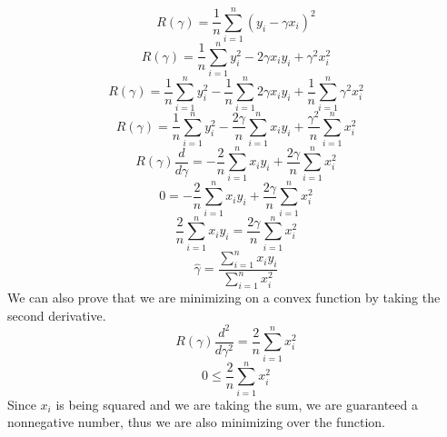 \documentclass[11pt]{article}
\begin{document}

\begin{Answer}
	$$R(\gamma) = \frac{1}{n}\sum^n_{i = 1}(y_i - \gamma x_i)^2$$
	$$R(\gamma) = \frac{1}{n}\sum^n_{i = 1}y_i^2 - 2\gamma x_iy_i + \gamma^2x_i^2$$
	$$R(\gamma) = \frac{1}{n}\sum^n_{i = 1}y_i^2 - \frac{1}{n}\sum^n_{i = 1}2\gamma x_iy_i + \frac{1}{n}\sum^n_{i = 1}\gamma^2x_i^2$$
	$$R(\gamma) = \frac{1}{n}\sum^n_{i = 1}y_i^2 - \frac{2\gamma}{n}\sum^n_{i = 1}x_iy_i + \frac{\gamma^2}{n}\sum^n_{i = 1}x_i^2$$
	$$R(\gamma)\frac{d}{d\gamma} = - \frac{2}{n}\sum^n_{i = 1}x_iy_i + \frac{2\gamma}{n}\sum^n_{i = 1}x_i^2$$
	$$0 = - \frac{2}{n}\sum^n_{i = 1}x_iy_i + \frac{2\gamma}{n}\sum^n_{i = 1}x_i^2$$
	$$\frac{2}{n}\sum^n_{i = 1}x_iy_i = \frac{2\gamma}{n}\sum^n_{i = 1}x_i^2$$
	$$\hat{\gamma} = \frac{\sum^n_{i = 1}x_iy_i}{\sum^n_{i = 1}x_i^2}$$
	We can also prove that we are minimizing on a convex function by taking the second derivative.
	$$R(\gamma)\frac{d^2}{d\gamma^2} = \frac{2}{n}\sum^n_{i = 1}x_i^2$$
	$$0 \leq \frac{2}{n}\sum^n_{i = 1}x_i^2$$
	Since $x_i$ is being squared and we are taking the sum, we are guaranteed a nonnegative number, thus we are also minimizing over the function.
\end{Answer}
\newpage
\end{document}
